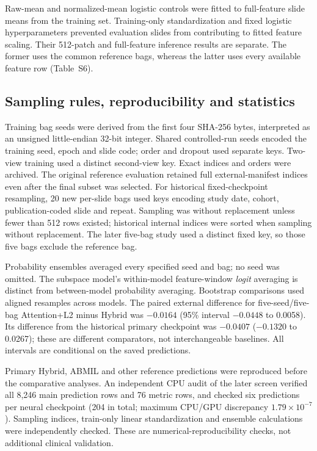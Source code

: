 Raw-mean and normalized-mean logistic controls were fitted to full-feature slide means from the training set. Training-only standardization and fixed logistic hyperparameters prevented evaluation slides from contributing to fitted feature scaling. Their 512-patch and full-feature inference results are separate. The former uses the common reference bags, whereas the latter uses every available feature row (Table~S6).

\subsection{Sampling rules, reproducibility and statistics}
Training bag seeds were derived from the first four SHA-256 bytes, interpreted as an unsigned little-endian 32-bit integer. Shared controlled-run seeds encoded the training seed, epoch and slide code; order and dropout used separate keys. Two-view training used a distinct second-view key. Exact indices and orders were archived. The original reference evaluation retained full external-manifest indices even after the final subset was selected. For historical fixed-checkpoint resampling, 20 new per-slide bags used keys encoding study date, cohort, publication-coded slide and repeat. Sampling was without replacement unless fewer than 512 rows existed; historical internal indices were sorted when sampling without replacement. The later five-bag study used a distinct fixed key, so those five bags exclude the reference bag.

Probability ensembles averaged every specified seed and bag; no seed was omitted. The subspace model's within-model feature-window \emph{logit} averaging is distinct from between-model probability averaging. Bootstrap comparisons used aligned resamples across models. The paired external difference for five-seed/five-bag Attention+L2 minus Hybrid was $-0.0164$ (95\% interval $-0.0448$ to 0.0058). Its difference from the historical primary checkpoint was $-0.0407$ ($-0.1320$ to 0.0267); these are different comparators, not interchangeable baselines. All intervals are conditional on the saved predictions.

Primary Hybrid, ABMIL and other reference predictions were reproduced before the comparative analyses. An independent CPU audit of the later screen verified all 8,246 main prediction rows and 76 metric rows, and checked six predictions per neural checkpoint (204 in total; maximum CPU/GPU discrepancy $1.79\times10^{-7}$). Sampling indices, train-only linear standardization and ensemble calculations were independently checked. These are numerical-reproducibility checks, not additional clinical validation.


